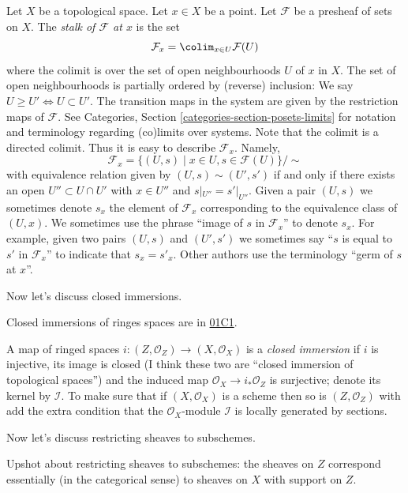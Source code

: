 \documentclass{book}
\begin{document}
\medskip\noindent
Let $X$ be a topological space. Let $x \in X$
be a point.
Let $\mathcal{F}$ be a presheaf of sets on
$X$.
The {\it stalk of $\mathcal{F}$ at $x$} is
the set
$$
\mathcal{F}_x
=
\colim_{x\in U} \mathcal{F}(U)
$$
where the colimit is over the set of open
neighbourhoods
$U$ of $x$ in $X$. The set of open
neighbourhoods is
partially ordered by (reverse) inclusion:
We say $U \geq U' \Leftrightarrow U \subset
U'$.
The transition maps in the system are
given by the restriction maps of
$\mathcal{F}$.
See Categories, Section
\ref{categories-section-posets-limits}
for notation and terminology regarding
(co)limits over systems.
Note that the colimit is a directed colimit.
Thus it is easy to describe $\mathcal{F}_x$.
Namely,
$$
\mathcal{F}_x
=
\{
(U, s)
\mid
x\in U, s\in \mathcal{F}(U)
\}/\sim
$$
with equivalence relation given by $(U, s)
\sim (U', s')$ if and only if
there exists an open $U'' \subset U \cap U'$
with $x \in U''$ and
$s|_{U''} = s'|_{U''}$. Given a pair $(U, s)$
we sometimes denote
$s_x$ the element of $\mathcal{F}_x$
corresponding to the equivalence
class of $(U, x)$. We sometimes use the
phrase
``image of $s$ in $\mathcal{F}_x$'' to denote
$s_x$.
For example, given two pairs $(U, s)$ and
$(U', s')$ we sometimes
say ``$s$ is equal to $s'$ in
$\mathcal{F}_x$'' to indicate
that $s_x = s'_x$. Other authors use the
terminology
``germ of $s$ at $x$''.

\medskip\noindent
Now let's discuss closed immersions.

\noindent
Closed immersions of ringes spaces are in
\href{https://stacks.math.columbia.edu/tag/%
01C1}{01C1}.

\begin{definition}
\label{definition-closed-immersion}
A map of ringed spaces
$i:(Z,\mathcal{O}_Z) \to (X,\mathcal{O}_X)$
is a {\it closed immersion}
if $i$ is injective,
its image is closed (I think these two are
``closed immersion of topological spaces'')
and the induced map $\mathcal{O}_X \to
i_*\mathcal{O}_Z$
is surjective; denote its kernel by
$\mathcal{I}$.
To make sure that if $(X,\mathcal{O}_X)$ is a
scheme
then so is $(Z,\mathcal{O}_Z)$ with add the
extra condition
that the $\mathcal{O}_X$-module $\mathcal{I}$
is
locally generated by sections.
\end{definition}

\medskip\noindent
Now let's discuss restricting sheaves to
subschemes.

Upshot about restricting sheaves to
subschemes:
the sheaves on $Z$ correspond essentially
(in the categorical sense)
to sheaves on $X$ with support on $Z$.
\end{document}
